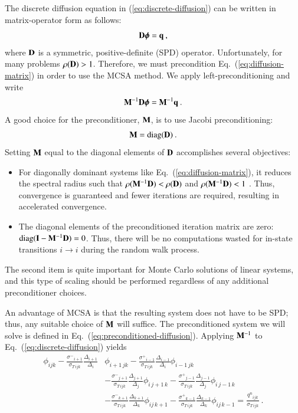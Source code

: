 \documentclass[preprint,12pt]{elsarticle}
\newcommand{\vI}{\ensuremath{\ve{I}}}
\newcommand{\qn}{\ensuremath{q^n}} \newcommand{\Tn}{\ensuremath{T^n}}
\newcommand{\Di}{\ensuremath{\Delta_i}}
\newcommand{\Dj}{\ensuremath{\Delta_j}}
\newcommand{\Dk}{\ensuremath{\Delta_k}}
\newcommand{\sigT}{\ensuremath{\sigma_{T\,ijk}}}
\newcommand{\sigm}{\ensuremath{\sigma^{-}}}
\newcommand{\sigp}{\ensuremath{\sigma^{+}}}
\newcommand{\bphi}{\ensuremath{\boldsymbol{\phi}}}
\DeclareMathOperator{\diag}{diag}
\begin{document}
The discrete diffusion equation in (\ref{eq:discrete-diffusion}) can be
written in matrix-operator form as follows:
\begin{equation}
  \ve{D}\bphi = \ve{q}\:,
  \label{eq:diffusion-matrix}
\end{equation}
where $\mathbf{D}$ is a symmetric, positive-definite (SPD) operator.
Unfortunately, for many problems $\rho(\mathbf{D}) > 1$.  Therefore, we must
precondition Eq.~(\ref{eq:diffusion-matrix}) in order to use the MCSA
method. We apply left-preconditioning and write
\begin{equation}
  \ve{M}^{-1}\ve{D}\bphi = \ve{M}^{-1}\ve{q}\:.
  \label{eq:preconditioned-diffusion}
\end{equation}
A good choice for the preconditioner, $\mathbf{M}$, is to use Jacobi
preconditioning:
\begin{equation}
  \ve{M}=\diag(\ve{D})\:.
  \label{eq:preconditioner}
\end{equation}
Setting $\mathbf{M}$ equal to the diagonal elements of $\mathbf{D}$ accomplishes
several objectives:
\begin{itemize}
\item For diagonally dominant systems like Eq.~(\ref{eq:diffusion-matrix}), it
  reduces the spectral radius such that $\rho(\mathbf{M}^{-1}\mathbf{D}) <
  \rho(\mathbf{D})$ and $\rho(\mathbf{M}^{-1}\mathbf{D}) < 1$ \cite{golub}.  Thus,
  convergence is guaranteed and fewer iterations are required, resulting in
  accelerated convergence.
\item The diagonal elements of the preconditioned iteration matrix are zero:
  $\diag(\vI - \ve{M}^{-1}\ve{D}) = 0$.  Thus, there will be no computations
  wasted for in-state transitions $i\rightarrow i$ during the random walk
  process.
\end{itemize}
The second item is quite important for Monte Carlo solutions of linear
systems, and this type of scaling should be performed regardless of any
additional preconditioner choices.

An advantage of MCSA is that the resulting system does not have to be SPD;
thus, any suitable choice of $\mathbf{M}$ will suffice.  The preconditioned system
we will solve is defined in Eq.~(\ref{eq:preconditioned-diffusion}).  Applying
$\mathbf{M}^{-1}$ to Eq.~(\ref{eq:discrete-diffusion}) yields
\begin{equation}
  \begin{aligned}
    \phi_{ijk} -
    \frac{\sigm_{i+1}}{\sigT}\frac{\Delta_{i+1}}{\Di}&\phi_{i+1\,jk} -
    \frac{\sigp_{i-1}}{\sigT}\frac{\Delta_{i-1}}{\Di}\phi_{i-1\,jk}\\ &-
    \frac{\sigm_{j+1}}{\sigT}\frac{\Delta_{j+1}}{\Dj}\phi_{i\,j+1\,k}
    -\frac{\sigp_{j-1}}{\sigT}\frac{\Delta_{j-1}}{\Dj}\phi_{i\,j-1\,k}\\ &-
    \frac{\sigm_{k+1}}{\sigT}\frac{\Delta_{k+1}}{\Dk}\phi_{ij\,k+1} -
    \frac{\sigp_{k-1}}{\sigT}\frac{\Delta_{k-1}}{\Dk}\phi_{ij\,k-1} =
    \frac{\qn_{ijk}}{\sigT}\:.
  \end{aligned}
  \label{eq:preconditioned-discrete-diffusion}
\end{equation}
\end{document}
